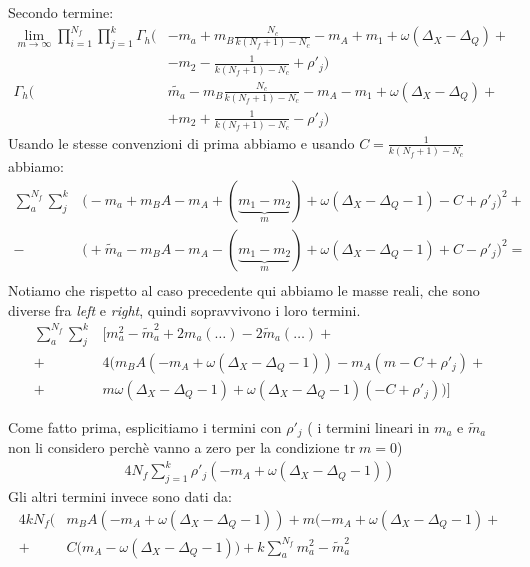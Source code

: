 \documentclass[a4paper,12pt]{article}
\begin{document}
Secondo termine:
\begin{align*}
\lim_{m \rightarrow \infty} \prod_{i=1}^{N_f} \prod_{j=1}^{k } \Gamma_h \big(& - m_a + m_B \frac{N_c}{k(N_f+1)-N_c }- m_A + m_1 + \omega ( \Delta_X - \Delta_Q)+\\
&  - m_2 - \frac{1}{k(N_f+1) - N_c} + \rho'_j \big) \\
\Gamma_h \big( & \tilde{m_a} - m_B \frac{N_c}{k(N_f+1)-N_c }- m_A - m_1 + \omega ( \Delta_X - \Delta_Q) +\\
& + m_2 + \frac{1}{k(N_f+1) - N_c} - \rho'_j \big)
\end{align*}
Usando le stesse convenzioni di prima abbiamo e usando $ C = \frac{1}{k(N_f+1)-N_c}$ abbiamo: 
\begin{align*}
\sum_a^{N_f} \sum_j^{k} &  \big(  - m_a + m_B A - m_A + (\underbrace{m_1 - m_2}_{m}) + \omega ( \Delta_X - \Delta_Q - 1) - C + \rho'_j \big)^2 +\\
	- &\big(  + \tilde{m}_a - m_B A - m_A - ( \underbrace{m_1 - m_2}_{m})  + \omega ( \Delta_X - \Delta_Q - 1) + C - \rho'_j \big)^2 = \\
\end{align*}
Notiamo che rispetto al caso precedente qui abbiamo le masse reali, che sono diverse fra \emph{left} e \emph{right}, quindi sopravvivono i loro termini.
\begin{align*}
\sum_a^{N_f} \sum_j^{k} &  \big[  m_a^2 - \tilde{m}_a^2 + 2 m_a ( \dots )  - 2 \tilde{m	}_a ( \dots) + \\
 + &4 \big( m_B A ( - m_A +  \omega ( \Delta_X - \Delta_Q - 1) ) - m_A ( m - C + \rho'_j)  + \\
+ &  m\omega ( \Delta_X - \Delta_Q - 1)  + \omega ( \Delta_X - \Delta_Q - 1) ( - C + \rho'_j) \big)\big]
\end{align*}

Come fatto prima, esplicitiamo i termini con $\rho'_j$ ( i termini lineari in $m_a$ e $\tilde{m}_a$ non li considero perchè vanno a zero per la condizione $ \mbox{tr}\; m = 0$)
\begin{align*}
 4 N_f \sum_{j=1}^k  \rho'_j ( - m_A +  \omega ( \Delta_X - \Delta_Q - 1) )
\end{align*}
Gli altri termini invece sono dati da:
\begin{align*}
4 k N_f \big(&  m_B A (- m_A +  \omega ( \Delta_X - \Delta_Q - 1)) + m ( - m_A +  \omega ( \Delta_X - \Delta_Q - 1)+ \\
+ & C ( m_A - \omega ( \Delta_X - \Delta_Q - 1) \big) + k \sum_a^{N_f} m_a^2 - \tilde{m}_a^2
\end{align*}
\end{document}
